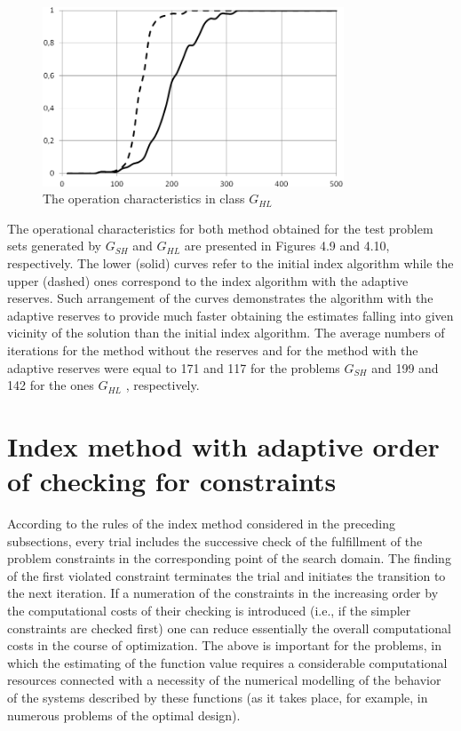 \documentclass[graybox]{svmult}
\begin{document}
\begin{figure}[h]
  \label{fig:4_10}
  \centering
  \includegraphics[width=0.8\textwidth]{figures/4_10.png}
  \caption{The operation characteristics in class $G_{HL}$}
\end{figure}

The operational characteristics for both method obtained for the test problem sets generated by $G_{SH}$ and $G_{HL}$ are presented in Figures 4.9 and 4.10, respectively. The lower (solid) curves refer to the initial index algorithm while the upper (dashed) ones correspond to the index algorithm with the adaptive reserves. Such arrangement of the curves demonstrates the algorithm with the
adaptive reserves to provide much faster obtaining the estimates falling into given vicinity of the solution than the initial index algorithm. The average numbers of iterations for the method
without the reserves and for the method with the adaptive reserves were equal to 171 and 117 for the problems $G_{SH}$ and 199 and 142 for the ones $G_{HL}$ , respectively.

\section{Index method with adaptive order of checking for constraints}
According to the rules of the index method considered in the preceding subsections, every trial includes the successive check of the fulfillment of the problem constraints in the corresponding point of the search domain. The finding of the first violated constraint terminates the trial and initiates the transition to the next iteration. If a numeration of the constraints in the increasing order by the computational costs of their checking is introduced (i.e., if the simpler constraints are checked first) one can reduce essentially the overall computational costs in the course of optimization. The above is important for the problems, in which the estimating of the function value requires a considerable computational resources connected with a necessity of the numerical modelling of the behavior of the systems described by these functions (as it takes place, for example, in numerous problems of the optimal design).
\end{document}
